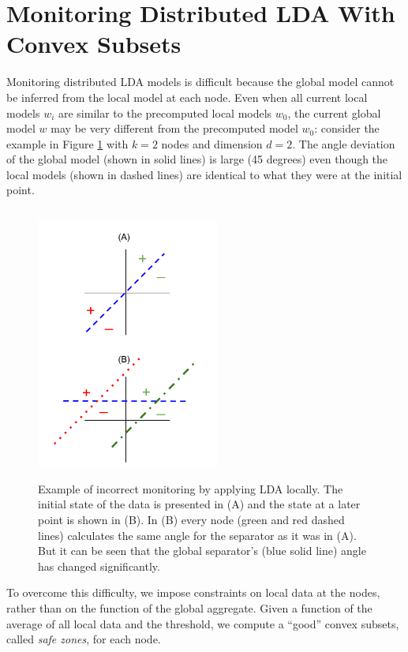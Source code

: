 \section{Monitoring Distributed LDA With Convex Subsets}
Monitoring distributed LDA models is difficult because the global model cannot be inferred from the local model at each node. Even when all current local models $w_i$ are similar to the precomputed local models $w_0$, the current global model $w$ may be very different from the precomputed model $w_0$: consider the example in Figure \ref{NegativeExample} with $k = 2$ nodes and dimension $d =2$. The angle deviation of the global model (shown in solid lines) is large (45 degrees) even though the local models (shown in dashed lines) are identical to what they were at the initial point.

\begin{figure}[h]
\centering
\includegraphics[width=60mm, height=9cm]{graphics/LDA/NegativeExample.png}
\caption{Example of incorrect monitoring by applying LDA locally. The
initial state of the data is presented in (A) and the state at a later point
is shown in (B). In (B) every node (green and red dashed lines) calculates the same angle
for the separator as it was in (A). But it can be
seen that the global separator's (blue solid line) angle has changed
significantly.}
\label{NegativeExample}
\end{figure}


\par To overcome this difficulty, we impose constraints on local data at the nodes, rather than on the function of the global aggregate. Given a function of the average of all local data and the threshold, we compute a ``good'' convex subsets, called \textit{safe zones}, for each node.

